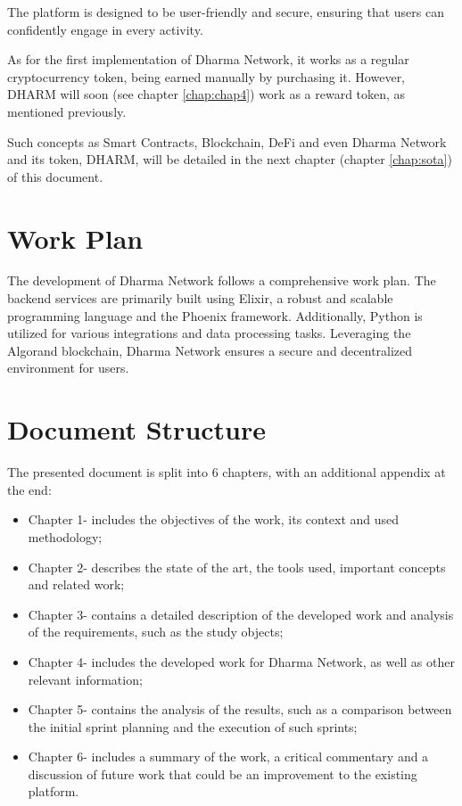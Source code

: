 The platform is designed to be user-friendly and secure, ensuring that users can confidently engage in every activity.\newline

As for the first implementation of Dharma Network, it works as a regular cryptocurrency token, being earned manually by purchasing it. However, DHARM will soon (see chapter \ref{chap:chap4}) work as a reward token, as mentioned previously.\newline

Such concepts as Smart Contracts, Blockchain, DeFi and even Dharma Network and its token, DHARM, will be detailed in the next chapter (chapter \ref{chap:sota}) of this document.

\section{Work Plan} \label{sec:plan}

The development of Dharma Network follows a comprehensive work plan. The backend services are primarily built using Elixir, a robust and scalable programming language and the Phoenix framework. Additionally, Python is utilized for various integrations and data processing tasks. Leveraging the Algorand blockchain, Dharma Network ensures a secure and decentralized environment for users.

\section{Document Structure} \label{sec:struct}

The presented document is split into 6 chapters, with an additional appendix at the end:

\begin{itemize}
    \item Chapter 1- includes the objectives of the work, its context and used methodology;
	\item Chapter 2- describes the state of the art, the tools used, important concepts and related work;
	\item Chapter 3- contains a detailed description of the developed work and analysis of the requirements, such as the study objects;
	\item  Chapter 4- includes the developed work for Dharma Network, as well as other relevant information;
	\item Chapter 5- contains the analysis of the results, such as a comparison between the initial sprint planning and the execution of such sprints;
	\item Chapter 6- includes a summary of the work, a critical commentary and a discussion of future work that could be an improvement to the existing platform.
\end{itemize}


